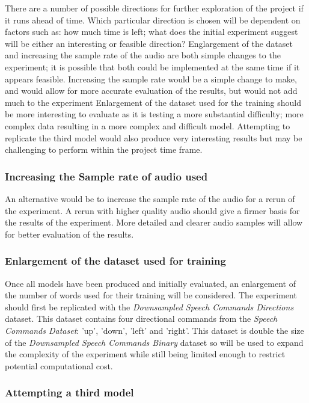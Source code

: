 \documentclass[a4paper, titlepage]{article}
\begin{document}
There are a number of possible directions for further exploration of the project if it runs ahead of time.
Which particular direction is chosen will be dependent on factors such as: how much time is left; what does the initial experiment suggest will be either an interesting or feasible direction?
Englargement of the dataset and increasing the sample rate of the audio are both simple changes to the experiment; it is possible that both could be implemented at the same time if it appears feasible.
Increasing the sample rate would be a simple change to make, and would allow for more accurate evaluation of the results, but would not add much to the experiment
Enlargement of the dataset used for the training should be more interesting to evaluate as it is testing a more substantial difficulty; more complex data resulting in a more complex and difficult model.
Attempting to replicate the third model would also produce very interesting results but may be challenging to perform within the project time frame.

\subsubsection{Increasing the Sample rate of audio used}

An alternative would be to increase the sample rate of the audio for a rerun of the experiment.
A rerun with higher quality audio should give a firmer basis for the results of the experiment.
More detailed and clearer audio samples will allow for better evaluation of the results.

\subsubsection{Enlargement of the dataset used for training}

Once all models have been produced and initially evaluated, an enlargement of the number of words used for their training will be considered.
The experiment should first be replicated with the \textit{Downsampled Speech Commands Directions} dataset.
This dataset contains four directional commands from the \textit{Speech Commands Dataset}: 'up', 'down', 'left' and 'right'.
This dataset is double the size of the \textit{Downsampled Speech Commands Binary} dataset so will be used to expand the complexity of the experiment while still being limited enough to restrict potential computational cost.

\subsubsection{Attempting a third model}
\end{document}
